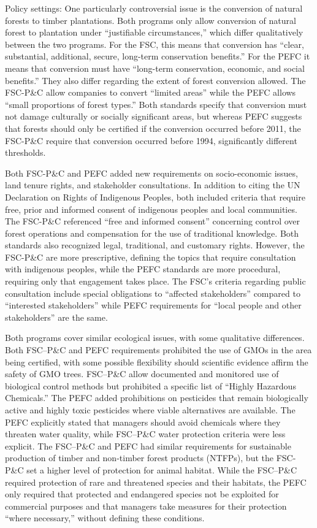 \documentclass[
      12pt,
            Review ]{article}
\begin{document}
Policy settings: One particularly controversial issue is the conversion
of natural forests to timber plantations. Both programs only allow
conversion of natural forest to plantation under ``justifiable
circumstances,'' which differ qualitatively between the two programs.
For the FSC, this means that conversion has ``clear, substantial,
additional, secure, long-term conservation benefits.'' For the PEFC it
means that conversion must have ``long-term conservation, economic, and
social benefits.'' They also differ regarding the extent of forest
conversion allowed. The FSC-P\&C allow companies to convert ``limited
areas'' while the PEFC allows ``small proportions of forest types.''
Both standards specify that conversion must not damage culturally or
socially significant areas, but whereas PEFC suggests that forests
should only be certified if the conversion occurred before 2011, the
FSC-P\&C require that conversion occurred before 1994, significantly
different thresholds.

Both FSC-P\&C and PEFC added new requirements on socio-economic issues,
land tenure rights, and stakeholder consultations. In addition to citing
the UN Declaration on Rights of Indigenous Peoples, both included
criteria that require free, prior and informed consent of indigenous
peoples and local communities. The FSC-P\&C referenced ``free and
informed consent'' concerning control over forest operations and
compensation for the use of traditional knowledge. Both standards also
recognized legal, traditional, and customary rights. However, the
FSC-P\&C are more prescriptive, defining the topics that require
consultation with indigenous peoples, while the PEFC standards are more
procedural, requiring only that engagement takes place. The FSC's
criteria regarding public consultation include special obligations to
``affected stakeholders'' compared to ``interested stakeholders'' while
PEFC requirements for ``local people and other stakeholders'' are the
same.

Both programs cover similar ecological issues, with some qualitative
differences. Both FSC--P\&C and PEFC requirements prohibited the use of
GMOs in the area being certified, with some possible flexibility should
scientific evidence affirm the safety of GMO trees. FSC--P\&C allow
documented and monitored use of biological control methods but
prohibited a specific list of ``Highly Hazardous Chemicals.'' The PEFC
added prohibitions on pesticides that remain biologically active and
highly toxic pesticides where viable alternatives are available. The
PEFC explicitly stated that managers should avoid chemicals where they
threaten water quality, while FSC--P\&C water protection criteria were
less explicit. The FSC--P\&C and PEFC had similar requirements for
sustainable production of timber and non-timber forest products (NTFPs),
but the FSC-P\&C set a higher level of protection for animal habitat.
While the FSC--P\&C required protection of rare and threatened species
and their habitats, the PEFC only required that protected and endangered
species not be exploited for commercial purposes and that managers take
measures for their protection ``where necessary,'' without defining
these conditions.
\end{document}
